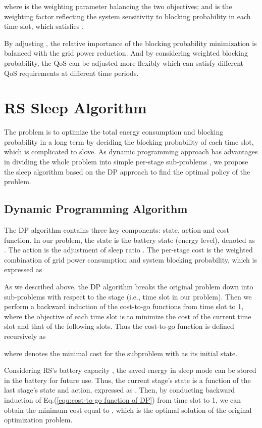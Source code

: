\documentclass[conference]{IEEEtran}
\begin{document}
 where  is the weighting parameter balancing the two objectives; and  is the weighting factor reflecting the system sensitivity to blocking probability in each time slot, which satisfies .

  By adjusting , the relative importance of the blocking probability minimization is balanced with the grid power reduction. And by considering weighted blocking probability, the QoS can be adjusted more flexibly which can satisfy different QoS requirements at different time periods.

 \section{RS Sleep Algorithm}\label{sec:algorithm}
 The problem is to optimize the total energy consumption and blocking probability in a long term by deciding the blocking probability of each time slot, which is complicated to slove. As dynamic programming approach has advantages in dividing the whole problem into simple per-stage sub-problems \cite{Dimitri2005Dynamic}, we propose the sleep algorithm based on the DP approach to find the optimal policy of the problem.

 \subsection{Dynamic Programming Algorithm}
 The DP algorithm contains three key components: state, action and cost function. In our problem, the state is the battery state (energy level), denoted as . The action is the adjustment of sleep ratio . The per-stage cost is the weighted combination of grid power consumption and system blocking probability, which is expressed as
 

 As we described above, the DP algorithm breaks the original problem down into sub-problems with respect to the stage (i.e., time slot in our problem). Then we perform a backward induction of the cost-to-go functions from time slot  to 1, where the objective of each time slot is to minimize the cost of the current time slot and that of the following slots. Thus the cost-to-go function is defined recursively as
 
 where  denotes the minimal cost for the subproblem with  as its initial state.

 Considering RS's battery capacity , the saved energy in sleep mode can be stored in the battery for future use. Thus, the current stage's state is a function of the last stage's state and action, expressed as .
  Then, by conducting backward induction of Eq.(\ref{equ:cost-to-go function of DP}) from time slot  to 1, we can obtain the minimum cost equal to , which is the optimal solution of the original optimization problem.
\end{document}
